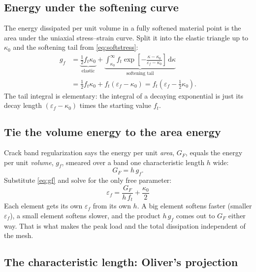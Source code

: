 \documentclass[11pt]{article}
\newcommand{\dd}{\,\mathrm{d}}
\begin{document}
\subsection{Energy under the softening curve}

The energy dissipated per unit volume in a fully softened material point is the area under
the uniaxial stress--strain curve. Split it into the elastic triangle up to $\kappa_0$ and
the softening tail from \eqref{eq:softstress}:
%
\begin{align}
g_f &= \underbrace{\tfrac{1}{2} f_t \kappa_0}_{\text{elastic}}
     + \underbrace{\int_{\kappa_0}^{\infty} f_t
       \exp\!\left[-\frac{\kappa-\kappa_0}{\varepsilon_f-\kappa_0}\right]\dd\kappa}_{\text{softening tail}}
     \\[2pt]
    &= \tfrac{1}{2} f_t \kappa_0 + f_t(\varepsilon_f-\kappa_0)
     = f_t\!\left(\varepsilon_f - \tfrac{1}{2}\kappa_0\right).
\label{eq:gf}
\end{align}
%
The tail integral is elementary: the integral of a decaying exponential is just its decay
length $(\varepsilon_f-\kappa_0)$ times the starting value $f_t$.

\subsection{Tie the volume energy to the area energy}

Crack band regularization says the energy per unit \emph{area}, $G_F$, equals the energy
per unit \emph{volume}, $g_f$, smeared over a band one characteristic length $h$ wide:
%
\begin{equation}
G_F = h\,g_f .
\end{equation}
%
Substitute \eqref{eq:gf} and solve for the only free parameter:
%
\begin{equation}
\boxed{\;\varepsilon_f = \frac{G_F}{h\,f_t} + \frac{\kappa_0}{2}\;}
\label{eq:epsf}
\end{equation}
%
Each element gets its own $\varepsilon_f$ from its own $h$. A big element softens faster
(smaller $\varepsilon_f$), a small element softens slower, and the product $h\,g_f$ comes
out to $G_F$ either way. That is what makes the peak load and the total dissipation
independent of the mesh.

\subsection{The characteristic length: Oliver's projection}
\end{document}
